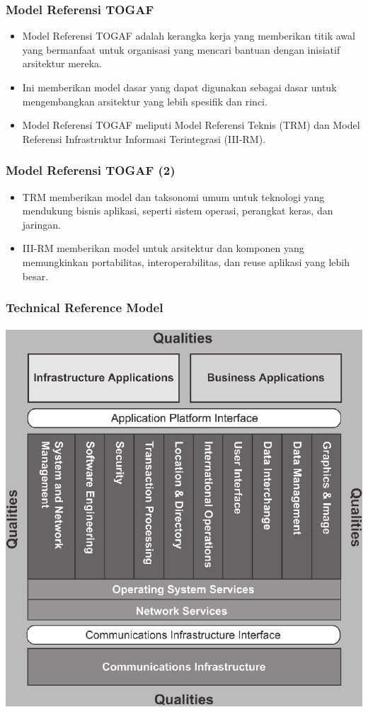 \documentclass[aspectratio=169, table]{beamer}
\begin{document}
	\begin{frame}
		\frametitle{Model Referensi TOGAF}
		\begin{itemize}
			\item Model Referensi TOGAF adalah kerangka kerja yang memberikan titik awal yang bermanfaat untuk organisasi yang mencari bantuan dengan inisiatif arsitektur mereka.
			\item Ini memberikan model dasar yang dapat digunakan sebagai dasar untuk mengembangkan arsitektur yang lebih spesifik dan rinci.
			\item Model Referensi TOGAF meliputi Model Referensi Teknis (TRM) dan Model Referensi Infrastruktur Informasi Terintegrasi (III-RM).

		\end{itemize}
	\end{frame}

\begin{frame}
	\frametitle{Model Referensi TOGAF (2)}
	\begin{itemize}
		\item TRM memberikan model dan taksonomi umum untuk teknologi yang mendukung bisnis aplikasi, seperti sistem operasi, perangkat keras, dan jaringan.
		\item III-RM memberikan model untuk arsitektur dan komponen yang memungkinkan portabilitas, interoperabilitas, dan reuse aplikasi yang lebih besar.
	\end{itemize}
\end{frame}

	{
		\begin{frame}
			\frametitle{Technical Reference Model}
			\framesubtitle{\hspace{1cm}}
			\begin{center}
				\includegraphics[width=.53\textwidth]{../figures/detailed_technical_reference_model}
			\end{center}
		\end{frame}
	}
\end{document}
